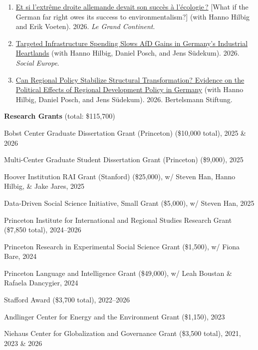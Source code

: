 \documentclass[letterpaper,10pt,oneside]{article}
\begin{document}
\begin{enumerate}
    \item \href{https://legrandcontinent.eu/fr/2026/11/08/et-si-lextreme-droite-allemande-devait-son-succes-a-lecologie/}{Et si l'extrême droite allemande devait son succès à l'écologie\,?} [What if the German far right owes its success to environmentalism?] (with Hanno Hilbig and Erik Voeten). 2026. \textit{Le Grand Continent}.
    \item \href{https://www.socialeurope.eu/targeted-infrastructure-spending-slows-afd-gains-in-germanys-industrial-heartlands}{Targeted Infrastructure Spending Slows AfD Gains in Germany's Industrial Heartlands} (with Hanno Hilbig, Daniel Posch, and Jens Südekum). 2026. \textit{Social Europe}.
    \item \href{https://www.bertelsmann-stiftung.de/en/publications/publication/did/can-regional-policy-stabilize-structural-transformation}{Can Regional Policy Stabilize Structural Transformation? Evidence on the Political Effects of Regional Development Policy in Germany} (with Hanno Hilbig, Daniel Posch, and Jens Südekum). 2026. Bertelsmann Stiftung.
\end{enumerate}

\newpage

{\large \textbf{Research Grants}} (total: \$115,700)

Bobst Center Graduate Dissertation Grant (Princeton) (\$10,000 total), 2025 \& 2026

Multi-Center Graduate Student Dissertation Grant (Princeton) (\$9,000), 2025

Hoover Institution RAI Grant (Stanford) (\$25,000), w/ Steven Han, Hanno Hilbig, \& Jake Jares, 2025

Data-Driven Social Science Initiative, Small Grant (\$5,000), w/ Steven Han, 2025

Princeton Institute for International and Regional Studies Research Grant (\$7,850 total), 2024--2026

Princeton Research in Experimental Social Science Grant (\$1,500), w/ Fiona Bare, 2024

Princeton Language and Intelligence Grant (\$49,000), w/ Leah Boustan \& Rafaela Dancygier, 2024

Stafford Award (\$3,700 total), 2022--2026

Andlinger Center for Energy and the Environment Grant (\$1,150), 2023

Niehaus Center for Globalization and Governance Grant (\$3,500 total), 2021, 2023 \& 2026
\end{document}
